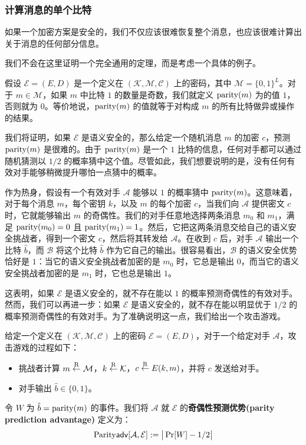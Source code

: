 \subsubsection{计算消息的单个比特}

如果一个加密方案是安全的，我们不仅应该很难恢复整个消息，也应该很难计算出关于消息的任何部分信息。

我们不会在这里证明一个完全通用的定理，而是考虑一个具体的例子。

假设 $\mathcal{E}=(E,D)$ 是一个定义在 $(\mathcal{K},\mathcal{M},\mathcal{C})$ 上的密码，其中 $\mathcal{M}=\{0,1\}^L$。对于 $m\in\mathcal{M}$，如果 $m$ 中比特 $1$ 的数量是奇数，我们就定义 ${\rm parity}(m)$ 为的值 $1$，否则就为 $0$。等价地说，${\rm parity}(m)$ 的值就等于对构成 $m$ 的所有比特做异或操作的结果。

我们将证明，如果 $\mathcal{E}$ 是语义安全的，那么给定一个随机消息 $m$ 的加密 $c$，预测 ${\rm parity}(m)$ 是很难的。由于 ${\rm parity}(m)$ 是一个 $1$ 比特的信息，任何对手都可以通过随机猜测以 $1/2$ 的概率猜中这个值。尽管如此，我们想要说明的是，没有任何有效对手能够稍微提升哪怕一点猜中的概率。

作为热身，假设有一个有效对手 $\mathcal{A}$ 能够以 $1$ 的概率猜中 ${\rm parity}(m)$。这意味着，对于每个消息 $m$，每个密钥 $k$，以及 $m$ 的每个加密 $c$，当我们向 $\mathcal{A}$ 提供密文 $c$ 时，它就能够输出 $m$ 的奇偶性。我们的对手任意地选择两条消息 $m_0$ 和 $m_1$，满足 ${\rm parity}(m_0)=0$ 且 ${\rm parity}(m_1)=1$。然后，它把这两条消息交给自己的语义安全挑战者，得到一个密文 $c$，然后将其转发给 $\mathcal{A}$。在收到 $c$ 后，对手 $\mathcal{A}$ 输出一个比特 $\hat b$，而 $\mathcal{B}$ 将这个比特 $\hat b$ 作为它自己的输出。很容易看出，$\mathcal{B}$ 的语义安全优势恰好是 $1$：当它的语义安全挑战者加密的是 $m_0$ 时，它总是输出 $0$，而当它的语义安全挑战者加密的是 $m_1$ 时，它也总是输出 $1$。

这表明，如果 $\mathcal{E}$ 是语义安全的，就不存在能以 $1$ 的概率预测奇偶性的有效对手。然而，我们可以再进一步：如果 $\mathcal{E}$ 是语义安全的，就不存在能以明显优于 $1/2$ 的概率预测奇偶性的有效对手。为了准确说明这一点，我们给出一个攻击游戏。

\begin{game}[奇偶性预测]\label{game:2-3}
给定一个定义在 $(\mathcal{K},\mathcal{M},\mathcal{C})$ 上的密码 $\mathcal{E}=(E,D)$，对于一个给定对手 $\mathcal{A}$，攻击游戏的过程如下：
\begin{itemize}
	\item 挑战者计算 $m\overset{\rm R}\leftarrow\mathcal{M}$，$k\overset{\rm R}\leftarrow\mathcal{K}$，$c\overset{\rm R}\leftarrow E(k,m)$，并将 $c$ 发送给对手。
	\item 对手输出 $\hat b\in\{0,1\}$。
\end{itemize}

令 $W$ 为 $\hat b={\rm parity}(m)$ 的事件。我们将 $\mathcal{A}$ 就 $\mathcal{E}$ 的\textbf{奇偶性预测优势(parity prediction advantage)} 定义为：
\[
{\rm Parity\mathsf{adv}}[\mathcal{A},\mathcal{E}]
:=
\big\lvert
\Pr[W]-{1}/{2}
\big\rvert
\]
\end{game}


